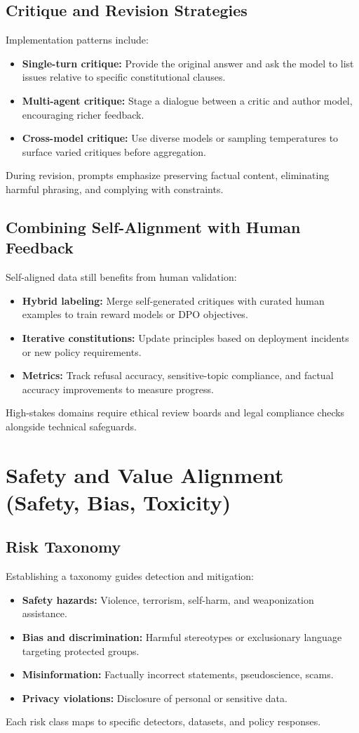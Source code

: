 \documentclass{article}
\begin{document}
\subsection{Critique and Revision Strategies}
Implementation patterns include:
\begin{itemize}
  \item \textbf{Single-turn critique:} Provide the original answer and ask the model to list issues relative to specific constitutional clauses.
  \item \textbf{Multi-agent critique:} Stage a dialogue between a critic and author model, encouraging richer feedback.
  \item \textbf{Cross-model critique:} Use diverse models or sampling temperatures to surface varied critiques before aggregation.
\end{itemize}
During revision, prompts emphasize preserving factual content, eliminating harmful phrasing, and complying with constraints.

\subsection{Combining Self-Alignment with Human Feedback}
Self-aligned data still benefits from human validation:
\begin{itemize}
  \item \textbf{Hybrid labeling:} Merge self-generated critiques with curated human examples to train reward models or DPO objectives.
  \item \textbf{Iterative constitutions:} Update principles based on deployment incidents or new policy requirements.
  \item \textbf{Metrics:} Track refusal accuracy, sensitive-topic compliance, and factual accuracy improvements to measure progress.
\end{itemize}
High-stakes domains require ethical review boards and legal compliance checks alongside technical safeguards.

\section{Safety and Value Alignment (Safety, Bias, Toxicity)}
\subsection{Risk Taxonomy}
Establishing a taxonomy guides detection and mitigation:
\begin{itemize}
  \item \textbf{Safety hazards:} Violence, terrorism, self-harm, and weaponization assistance.
  \item \textbf{Bias and discrimination:} Harmful stereotypes or exclusionary language targeting protected groups.
  \item \textbf{Misinformation:} Factually incorrect statements, pseudoscience, scams.
  \item \textbf{Privacy violations:} Disclosure of personal or sensitive data.
\end{itemize}
Each risk class maps to specific detectors, datasets, and policy responses.
\end{document}
